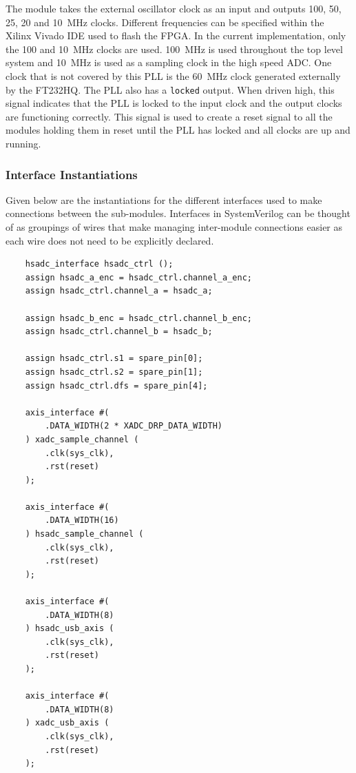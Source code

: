 \documentclass[letterpaper,11pt]{article}
\newcommand{\code}[1]{\texttt{#1}}
\begin{document}
The module takes the external oscillator clock as an input and outputs 100, 50,
25, 20 and \SI{10}{\mega\hertz} clocks. Different frequencies can be specified
within the Xilinx Vivado IDE used to flash the FPGA. In the current
implementation, only the 100 and \SI{10}{\mega\hertz} clocks are used.
\SI{100}{\mega\hertz} is used throughout the top level system and
\SI{10}{\mega\hertz} is used as a sampling clock in the high speed ADC. One
clock that is not covered by this PLL is the \SI{60}{\mega\hertz} clock
generated externally by the FT232HQ. The PLL also has a \code{locked} output.
When driven high, this signal indicates that the PLL is locked to the input
clock and the output clocks are functioning correctly. This signal is used to
create a reset signal to all the modules holding them in reset until the PLL has
locked and all clocks are up and running.

\subsubsection{Interface Instantiations} \label{sec:interface-inst}

Given below are the instantiations for the different interfaces used to make
connections between the sub-modules. Interfaces in SystemVerilog can be thought
of as groupings of wires that make managing inter-module connections easier as
each wire does not need to be explicitly declared.

\begin{verbatim}
    hsadc_interface hsadc_ctrl ();
    assign hsadc_a_enc = hsadc_ctrl.channel_a_enc;
    assign hsadc_ctrl.channel_a = hsadc_a;

    assign hsadc_b_enc = hsadc_ctrl.channel_b_enc;
    assign hsadc_ctrl.channel_b = hsadc_b;

    assign hsadc_ctrl.s1 = spare_pin[0];
    assign hsadc_ctrl.s2 = spare_pin[1];
    assign hsadc_ctrl.dfs = spare_pin[4];

    axis_interface #(
        .DATA_WIDTH(2 * XADC_DRP_DATA_WIDTH)
    ) xadc_sample_channel (
        .clk(sys_clk),
        .rst(reset)
    );

    axis_interface #(
        .DATA_WIDTH(16)
    ) hsadc_sample_channel (
        .clk(sys_clk),
        .rst(reset)
    );

    axis_interface #(
        .DATA_WIDTH(8)
    ) hsadc_usb_axis (
        .clk(sys_clk),
        .rst(reset)
    );

    axis_interface #(
        .DATA_WIDTH(8)
    ) xadc_usb_axis (
        .clk(sys_clk),
        .rst(reset)
    );
\end{verbatim}
\end{document}
